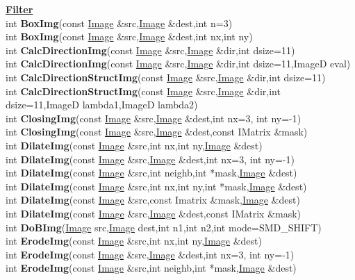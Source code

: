\documentclass[10pt,titlepage]{article}
\newcommand{\subtitle}[1]{{\noindent\bf#1}}
\def\functionlistentry#1#2#3#4#5#6{\noindent #1 {\bf #2}(#3) \dotfill #6\\}
\begin{document}
{{\subtitle{\hyperlink{SECTION:filter}{Filter}}\\
\functionlistentry{int}{BoxImg}{const \hyperlink{Image}{Image} \&src,\hyperlink{Image}{Image} \&dest,int n=3}{343}{filter}{}
\functionlistentry{int}{BoxImg}{const \hyperlink{Image}{Image} \&src,\hyperlink{Image}{Image} \&dest,int nx,int ny}{344}{filter}{}
\functionlistentry{int}{CalcDirectionImg}{const \hyperlink{Image}{Image} \&src,\hyperlink{Image}{Image} \&dir,int dsize=11}{360}{filter}{}
\functionlistentry{int}{CalcDirectionImg}{const \hyperlink{Image}{Image} \&src,\hyperlink{Image}{Image} \&dir,int dsize=11,ImageD eval}{361}{filter}{}
\functionlistentry{int}{CalcDirectionStructImg}{const \hyperlink{Image}{Image} \&src,\hyperlink{Image}{Image} \&dir,int dsize=11}{362}{filter}{}
\functionlistentry{int}{CalcDirectionStructImg}{const \hyperlink{Image}{Image} \&src,\hyperlink{Image}{Image} \&dir,int dsize=11,ImageD lambda1,ImageD lambda2}{363}{filter}{}
\functionlistentry{int}{ClosingImg}{const \hyperlink{Image}{Image} \&src,\hyperlink{Image}{Image} \&dest,int nx=3, int ny=-1}{381}{filter}{}
\functionlistentry{int}{ClosingImg}{const \hyperlink{Image}{Image} \&src,\hyperlink{Image}{Image} \&dest,const IMatrix \&mask}{382}{filter}{}
\functionlistentry{int}{DilateImg}{const \hyperlink{Image}{Image} \&src,int nx,int ny,\hyperlink{Image}{Image} \&dest}{373}{filter}{}
\functionlistentry{int}{DilateImg}{const \hyperlink{Image}{Image} \&src,\hyperlink{Image}{Image} \&dest,int nx=3, int ny=-1}{374}{filter}{}
\functionlistentry{int}{DilateImg}{const \hyperlink{Image}{Image} \&src,int neighb,int *mask,\hyperlink{Image}{Image} \&dest}{375}{filter}{}
\functionlistentry{int}{DilateImg}{const \hyperlink{Image}{Image} \&src,int nx,int ny,int *mask,\hyperlink{Image}{Image} \&dest}{376}{filter}{}
\functionlistentry{int}{DilateImg}{const \hyperlink{Image}{Image} \&src,const Imatrix \&mask,\hyperlink{Image}{Image} \&dest}{377}{filter}{}
\functionlistentry{int}{DilateImg}{const \hyperlink{Image}{Image} \&src,\hyperlink{Image}{Image} \&dest,const IMatrix \&mask}{378}{filter}{}
\functionlistentry{int}{DoBImg}{\hyperlink{Image}{Image} src,\hyperlink{Image}{Image} dest,int n1,int n2,int mode=SMD\_SHIFT}{345}{filter}{}
\functionlistentry{int}{ErodeImg}{const \hyperlink{Image}{Image} \&src,int nx,int ny,\hyperlink{Image}{Image} \&dest}{367}{filter}{}
\functionlistentry{int}{ErodeImg}{const \hyperlink{Image}{Image} \&src,\hyperlink{Image}{Image} \&dest,int nx=3, int ny=-1}{368}{filter}{}
\functionlistentry{int}{ErodeImg}{const \hyperlink{Image}{Image} \&src,int neighb,int *mask,\hyperlink{Image}{Image} \&dest}{369}{filter}{}
}}
\end{document}
